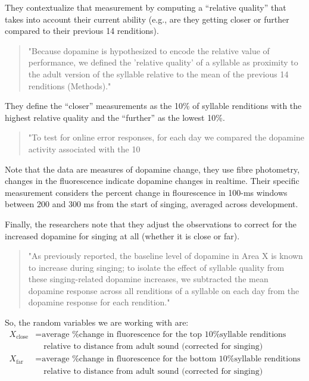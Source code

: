 \documentclass[
]{article}
\begin{document}
They contextualize that measurement by computing a ``relative quality''
that takes into account their current ability (e.g., are they getting
closer or further compared to their previous 14 renditions).

\begin{quote}
"Because dopamine is hypothesized to encode the relative value of performance, we defined the 'relative quality' of a syllable as proximity to the adult version of the syllable relative to the mean of the previous 14 renditions (Methods)."
\end{quote}

They define the ``closer'' measurements as the 10\% of syllable
renditions with the highest relative quality and the ``further'' as the
lowest 10\%.

\begin{quote}
"To test for online error responses, for each day we compared the dopamine activity associated with the 10%
\end{quote}

Note that the data are measures of dopamine change, they use fibre
photometry, changes in the fluorescence indicate dopamine changes in
realtime. Their specific measurement considers the percent change in
flourescence in 100-ms windows between 200 and 300 ms from the start of
singing, averaged across development.

Finally, the researchers note that they adjust the observations to
correct for the increased dopamine for singing at all (whether it is
close or far).

\begin{quote}
"As previously reported, the baseline level of dopamine in Area X is known to increase during singing; to isolate the effect of syllable quality from these singing-related dopamine increases, we subtracted the mean dopamine response across all renditions of a syllable on each day from the dopamine response for each rendition."
\end{quote}

So, the random variables we are working with are: \begin{align*}
X_{\text{close}} &= \text{average \% change in fluorescence for the top 10\% syllable renditions} \\
&\quad \text{relative to distance from adult sound (corrected for singing)} \\[1ex]
X_{\text{far}} &= \text{average \% change in fluorescence for the bottom 10\% syllable renditions} \\
&\quad \text{relative to distance from adult sound (corrected for singing)}
\end{align*}
\end{document}
